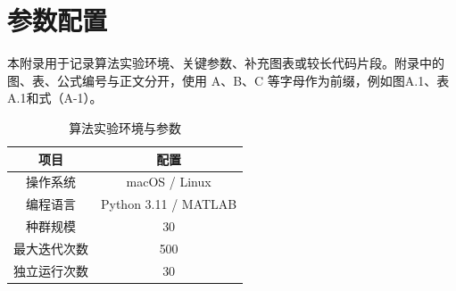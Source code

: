 
\section{参数配置}

本附录用于记录算法实验环境、关键参数、补充图表或较长代码片段。附录中的图、表、公式编号与正文分开，使用 A、B、C 等字母作为前缀，例如图A.1、表A.1和式（A-1）。

\begin{table}[htbp]
  \centering
  \caption{算法实验环境与参数}
  \label{tab:appendix-env}
  \begin{tabular}{cc}
    \toprule
    项目 & 配置 \\
    \midrule
    操作系统 & macOS / Linux \\
    编程语言 & Python 3.11 / MATLAB \\
    种群规模 & 30 \\
    最大迭代次数 & 500 \\
    独立运行次数 & 30 \\
    \bottomrule
  \end{tabular}
\end{table}
